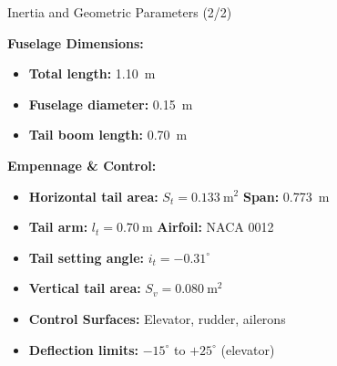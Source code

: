 \documentclass[aspectratio=169,18pt]{beamer}
\begin{document}
\begin{frame}{Inertia and Geometric Parameters (2/2)}


\textbf{\color{navymain}Fuselage Dimensions:}
\begin{itemize}
\item \textbf{Total length:} \SI{1.10}{\meter}
\item \textbf{Fuselage diameter:} \SI{0.15}{\meter}
\item \textbf{Tail boom length:} \SI{0.70}{\meter}
\end{itemize}

\vspace{0.3cm}
\textbf{\color{navymain}Empennage \& Control:}
\begin{itemize}
\item \textbf{Horizontal tail area:} $S_t = \SI{0.133}{\meter\squared}$ \quad \textbf{Span:} \SI{0.773}{\meter}
\item \textbf{Tail arm:} $l_t = \SI{0.70}{\meter}$ \quad \textbf{Airfoil:} NACA 0012
\item \textbf{Tail setting angle:} $i_t = -0.31^\circ$
\item \textbf{Vertical tail area:} $S_v = \SI{0.080}{\meter\squared}$
\item \textbf{Control Surfaces:} Elevator, rudder, ailerons
\item \textbf{Deflection limits:} $-15^\circ$ to $+25^\circ$ (elevator)
\end{itemize}
\end{frame}
\end{document}
